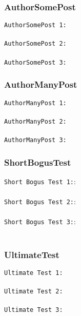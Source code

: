 \begin{description}
\subsubsection{AuthorSomePost}
\texttt{AuthorSomePost 1:}\\
\\

\texttt{AuthorSomePost 2:}\\
\\

\texttt{AuthorSomePost 3:}\\


\subsubsection{AuthorManyPost}
\texttt{AuthorManyPost 1:}\\
\\

\texttt{AuthorManyPost 2:}\\
\\

\texttt{AuthorManyPost 3:}\\


\subsubsection{ShortBogusTest}
\texttt{Short Bogus Test 1:}:\\
\\

\texttt{Short Bogus Test 2:}:\\
\\

\texttt{Short Bogus Test 3:}:\\
\\

\subsubsection{UltimateTest}
\texttt{Ultimate Test 1:}\\
\\

\texttt{Ultimate Test 2:}\\
\\

\texttt{Ultimate Test 3:}\\
\\

\end{description}

